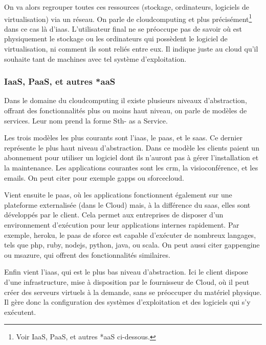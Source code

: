 \documentclass[a4paper,oneside]{report}
\begin{document}
On va alors regrouper toutes ces ressources (stockage, ordinateurs, logiciels de \gls{virtualisation}) via un réseau.
On parle de \gls{cloudcomputing} et plus précisément\footnote{Voir \og IaaS, PaaS, et autres *aaS \fg ci-dessous.} dans ce cas là d’\gls{iaas}.
L'utilisateur final ne se préoccupe pas de savoir où est physiquement le stockage ou les ordinateurs qui possèdent le logiciel de \gls{virtualisation}, ni comment ils sont reliés entre eux. Il indique juste au cloud qu’il souhaite tant de machines avec tel système d'exploitation.

\subsubsection{IaaS, PaaS, et autres *aaS}
  
Dans le domaine du \gls{cloudcomputing} il existe plusieurs niveaux d'abstraction, offrant des fonctionnalités plus ou moins haut niveau, on parle de modèles de services.
Leur nom prend la forme Sth- as a Service.

Les trois modèles les plus courants sont l'\gls{iaas}, le \gls{paas}, et le \gls{saas}.
Ce dernier représente le plus haut niveau d'abstraction.\newline
Dans ce modèle les clients paient un abonnement pour utiliser un logiciel dont ils n'auront pas à gérer l'installation et la maintenance.
Les applications courantes sont les \gls{crm}, la visioconférence, et les emails.
On peut citer pour exemple \gls{gapps} ou \gls{sforcecloud}.

Vient ensuite le \gls{paas}, où les applications fonctionnent également sur une plateforme externalisée (dans le Cloud) mais, à la différence du \gls{saas}, elles sont développés par le client.\newline
Cela permet aux entreprises de disposer d'un environnement d'exécution pour leur applications internes rapidement.
Par exemple, \gls{heroku}, le \gls{paas} de \gls{sforce} est capable d'exécuter de nombreux langages, tels que \gls{php}, \gls{ruby}, \gls{nodejs}, \gls{python}, \gls{java}, ou \gls{scala}.
On peut aussi citer \gls{gappengine} ou \gls{msazure}, qui offrent des fonctionnalités similaires.

Enfin vient l'\gls{iaas}, qui est le plus bas niveau d'abstraction. 
Ici le client dispose d'une infrastructure, mise à disposition par le fournisseur de Cloud, où il peut créer des serveurs virtuels à la demande, sans se préoccuper du matériel physique.
Il gère donc la configuration des systèmes d'exploitation et des logiciels qui s'y exécutent.
\end{document}
